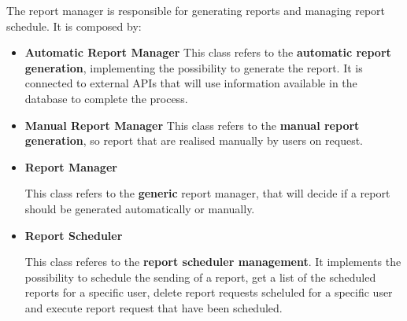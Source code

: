 \documentclass{article}
\begin{document}
The report manager is responsible for generating reports and managing report schedule. It is composed by:

\begin{itemize}

\item \textbf{Automatic Report Manager}
This class refers to the \textbf{automatic report generation}, implementing the possibility to generate the report. It is connected to external APIs that will use information available in the database to complete the process.

\item \textbf{Manual Report Manager}
This class refers to the \textbf{manual report generation}, so report that are realised manually by users on request.

\item \textbf{Report Manager}

This class refers to the \textbf{generic} report manager, that will decide if a report should be generated automatically or manually.

\item \textbf{Report Scheduler}

This class referes to the \textbf{report scheduler management}. It implements the possibility to schedule the sending of a report, get a list of the scheduled reports for a specific user, delete report requests scheluled for a specific user and execute report request that have been scheduled.

\end{itemize}
\end{document}
